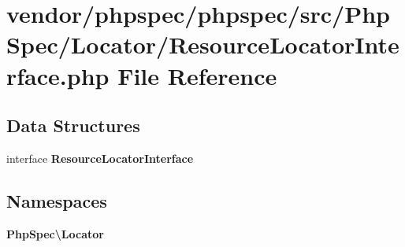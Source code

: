 \section{vendor/phpspec/phpspec/src/\+Php\+Spec/\+Locator/\+Resource\+Locator\+Interface.php File Reference}
\label{_resource_locator_interface_8php}
\subsection*{Data Structures}
\begin{DoxyCompactItemize}
\item 
interface {\bf Resource\+Locator\+Interface}
\end{DoxyCompactItemize}
\subsection*{Namespaces}
\begin{DoxyCompactItemize}
\item 
 {\bf Php\+Spec\textbackslash{}\+Locator}
\end{DoxyCompactItemize}
